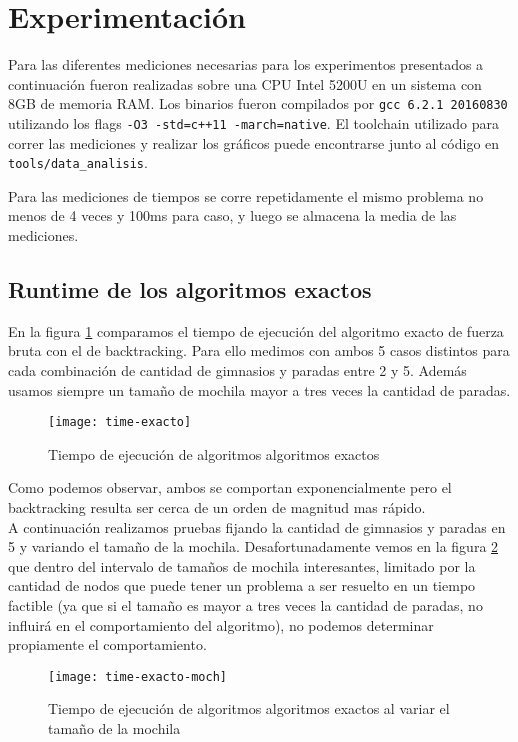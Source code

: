 \section{Experimentación}

Para las diferentes mediciones necesarias para los experimentos presentados a continuación fueron realizadas sobre una CPU Intel 5200U en un sistema con 8GB de memoria RAM. Los binarios fueron compilados por \texttt{gcc 6.2.1 20160830} utilizando los flags \texttt{-O3 -std=c++11 -march=native}. El toolchain utilizado para correr las mediciones y realizar los gráficos puede encontrarse junto al código en \texttt{tools/data_analisis}.

Para las mediciones de tiempos se corre repetidamente el mismo problema no menos de 4 veces y 100ms para caso, y luego se almacena la media de las mediciones.

\subsection{Runtime de los algoritmos exactos}

En la figura \ref{fig:time-exacto} comparamos el tiempo de ejecución del algoritmo exacto de fuerza bruta con el de backtracking.
Para ello medimos con ambos 5 casos distintos para cada combinación de cantidad de gimnasios y paradas entre 2 y 5. Además usamos siempre un tamaño de mochila mayor a tres veces la cantidad de paradas.

\begin{figure}[H]
	\centering
	\texttt{[image: time-exacto]}
	\caption{Tiempo de ejecución de algoritmos algoritmos exactos}
	\label{fig:time-exacto}
\end{figure}

Como podemos observar, ambos se comportan exponencialmente pero el backtracking resulta ser cerca de un orden de magnitud mas rápido.
\\

A continuación realizamos pruebas fijando la cantidad de gimnasios y paradas en 5 y variando el tamaño de la mochila.
Desafortunadamente vemos en la figura \ref{fig:time-exacto-moch} que dentro del intervalo de tamaños de mochila
interesantes, limitado por la cantidad de nodos que puede tener un problema a ser resuelto en un tiempo factible
(ya que si el tamaño es mayor a tres veces la cantidad de paradas, no influirá en el comportamiento del algoritmo),
no podemos determinar propiamente el comportamiento.

\begin{figure}[H]
	\centering
	\texttt{[image: time-exacto-moch]}
	\caption{Tiempo de ejecución de algoritmos algoritmos exactos al variar el tamaño de la mochila}
	\label{fig:time-exacto-moch}
\end{figure}

